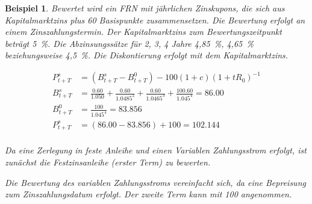 \documentclass[12pt, a4paper]{article}
\theoremstyle{plain}
\newtheorem{example}{Beispiel}
\begin{document}
\begin{example}
	Bewertet wird ein \gls{FRN} mit jährlichen Zinskupons, die sich aus Kapitalmarktzins plus 60 Basispunkte zusammensetzen. Die Bewertung erfolgt an einem Zinszahlungstermin. Der Kapitalmarktzins zum Bewertungszeitpunkt beträgt 5~\%. Die Abzinsungssätze für 2, 3, 4 Jahre 4,85~\%, 4,65~\% beziehungsweise 4,5~\%.
	Die Diskontierung erfolgt mit dem Kapitalmarktzins.

	\begin{align*}
		P_{t+T}^{s}&=\left(B_{t+T}^{s}-B_{t+T}^{0}\right)-100(1+c)\left(1+t R_{0}\right)^{-1}\\
		B_{t+T}^{s}&=\frac{0.60}{1.050}+\frac{0.60}{1.0485^2}+\frac{0.60}{1.0465^3}+\frac{100.60}{1.045^4}=86.00\\
		B_{t+T}^{0}&=\frac{100}{1.045^4}=83.856\\
		P_{t+T}^{s}&= (86.00-83.856) + 100 = 102.144\\
	\end{align*}

	Da eine Zerlegung in feste Anleihe und einen Variablen Zahlungsstrom erfolgt, ist zunächst die Festzinsanleihe (erster Term) zu bewerten.

	Die Bewertung des variablen Zahlungsstroms vereinfacht sich, da eine Bepreisung zum Zinszahlungsdatum erfolgt. Der zweite Term kann mit 100 angenommen.
\end{example}



 
\end{document}
